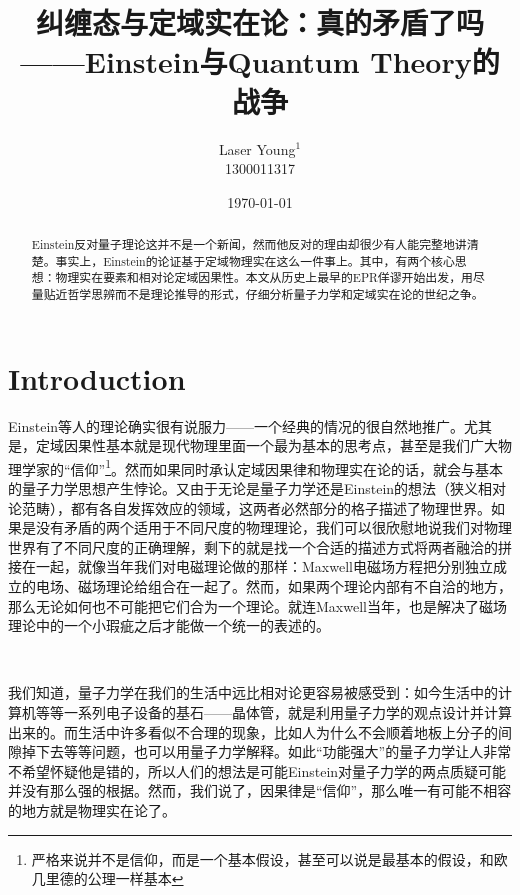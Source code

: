 \documentclass[aps,showpacs,twocolumn]{revtex4}%
\begin{document}
\title{纠缠态与定域实在论：真的矛盾了吗\\ ——Einstein与Quantum Theory的战争}
\author{Laser Young$^{1}$\\ 1300011317}
\date{\today}
\begin{abstract}

Einstein反对量子理论这并不是一个新闻，然而他反对的理由却很少有人能完整地讲清楚。事实上，Einstein的论证基于定域物理实在这么一件事上\cite{PhysRev.47.777}。其中，有两个核心思想：物理实在要素和相对论定域因果性。本文从历史上最早的EPR佯谬开始出发，用尽量贴近哲学思辨而不是理论推导的形式，仔细分析量子力学和定域实在论的世纪之争。

\end{abstract}

\maketitle
\tableofcontents

\section{Introduction}

Einstein等人的理论确实很有说服力——一个经典的情况的很自然地推广。尤其是，定域因果性基本就是现代物理里面一个最为基本的思考点，甚至是我们广大物理学家的“信仰”\footnote{严格来说并不是信仰，而是一个基本假设，甚至可以说是最基本的假设，和欧几里德的公理一样基本}。然而如果同时承认定域因果律和物理实在论的话，就会与基本的量子力学思想产生悖论。又由于无论是量子力学还是Einstein的想法（狭义相对论范畴），都有各自发挥效应的领域，这两者必然部分的格子描述了物理世界。如果是没有矛盾的两个适用于不同尺度的物理理论，我们可以很欣慰地说我们对物理世界有了不同尺度的正确理解，剩下的就是找一个合适的描述方式将两者融洽的拼接在一起，就像当年我们对电磁理论做的那样：Maxwell电磁场方程把分别独立成立的电场、磁场理论给组合在一起了。然而，如果两个理论内部有不自洽的地方，那么无论如何也不可能把它们合为一个理论。就连Maxwell当年，也是解决了磁场理论中的一个小瑕疵之后才能做一个统一的表述的。

\ 

我们知道，量子力学在我们的生活中远比相对论更容易被感受到：如今生活中的计算机等等一系列电子设备的基石——晶体管，就是利用量子力学的观点设计并计算出来的。而生活中许多看似不合理的现象，比如人为什么不会顺着地板上分子的间隙掉下去等等问题，也可以用量子力学解释。如此“功能强大”的量子力学让人非常不希望怀疑他是错的，所以人们的想法是可能Einstein对量子力学的两点质疑可能并没有那么强的根据。然而，我们说了，因果律是“信仰”，那么唯一有可能不相容的地方就是物理实在论了。
\end{document}
